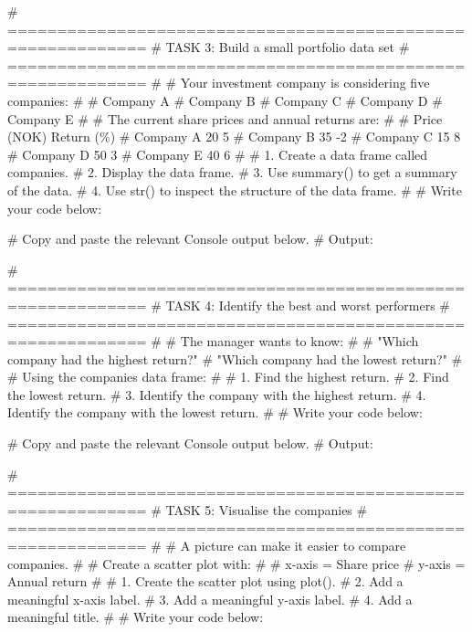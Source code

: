 \documentclass[
  12pt,
  letterpaper,
]{scrbook}
\newenvironment{Shaded}{\begin{snugshade}}{\end{snugshade}}
\newcommand{\AlertTok}[1]{\textcolor[rgb]{0.68,0.00,0.00}{#1}}
\newcommand{\CommentTok}[1]{\textcolor[rgb]{0.37,0.37,0.37}{#1}}
\theoremstyle{plain}
\theoremstyle{definition}
\theoremstyle{remark}
\begin{document}
\begin{Shaded}
\begin{Highlighting}[]
\CommentTok{\# ============================================================}
\CommentTok{\# }\AlertTok{TASK}\CommentTok{ 3: Build a small portfolio data set}
\CommentTok{\# ============================================================}
\CommentTok{\#}
\CommentTok{\# Your investment company is considering five companies:}
\CommentTok{\#}
\CommentTok{\# Company A}
\CommentTok{\# Company B}
\CommentTok{\# Company C}
\CommentTok{\# Company D}
\CommentTok{\# Company E}
\CommentTok{\#}
\CommentTok{\# The current share prices and annual returns are:}
\CommentTok{\#}
\CommentTok{\#             Price (NOK)     Return (\%)}
\CommentTok{\# Company A       20              5}
\CommentTok{\# Company B       35             {-}2}
\CommentTok{\# Company C       15              8}
\CommentTok{\# Company D       50              3}
\CommentTok{\# Company E       40              6}
\CommentTok{\#}
\CommentTok{\# 1. Create a data frame called \textasciigrave{}companies\textasciigrave{}.}
\CommentTok{\# 2. Display the data frame.}
\CommentTok{\# 3. Use \textasciigrave{}summary()\textasciigrave{} to get a summary of the data.}
\CommentTok{\# 4. Use \textasciigrave{}str()\textasciigrave{} to inspect the structure of the data frame.}
\CommentTok{\#}
\CommentTok{\# Write your code below:}


\CommentTok{\# Copy and paste the relevant Console output below.}
\CommentTok{\# Output:}


\CommentTok{\# ============================================================}
\CommentTok{\# }\AlertTok{TASK}\CommentTok{ 4: Identify the best and worst performers}
\CommentTok{\# ============================================================}
\CommentTok{\#}
\CommentTok{\# The manager wants to know:}
\CommentTok{\#}
\CommentTok{\# "Which company had the highest return?"}
\CommentTok{\# "Which company had the lowest return?"}
\CommentTok{\#}
\CommentTok{\# Using the \textasciigrave{}companies\textasciigrave{} data frame:}
\CommentTok{\#}
\CommentTok{\# 1. Find the highest return.}
\CommentTok{\# 2. Find the lowest return.}
\CommentTok{\# 3. Identify the company with the highest return.}
\CommentTok{\# 4. Identify the company with the lowest return.}
\CommentTok{\#}
\CommentTok{\# Write your code below:}


\CommentTok{\# Copy and paste the relevant Console output below.}
\CommentTok{\# Output:}


\CommentTok{\# ============================================================}
\CommentTok{\# }\AlertTok{TASK}\CommentTok{ 5: Visualise the companies}
\CommentTok{\# ============================================================}
\CommentTok{\#}
\CommentTok{\# A picture can make it easier to compare companies.}
\CommentTok{\#}
\CommentTok{\# Create a scatter plot with:}
\CommentTok{\#}
\CommentTok{\#     x{-}axis = Share price}
\CommentTok{\#     y{-}axis = Annual return}
\CommentTok{\#}
\CommentTok{\# 1. Create the scatter plot using \textasciigrave{}plot()\textasciigrave{}.}
\CommentTok{\# 2. Add a meaningful x{-}axis label.}
\CommentTok{\# 3. Add a meaningful y{-}axis label.}
\CommentTok{\# 4. Add a meaningful title.}
\CommentTok{\#}
\CommentTok{\# Write your code below:}



\end{Highlighting}
\end{Shaded}
\end{document}
